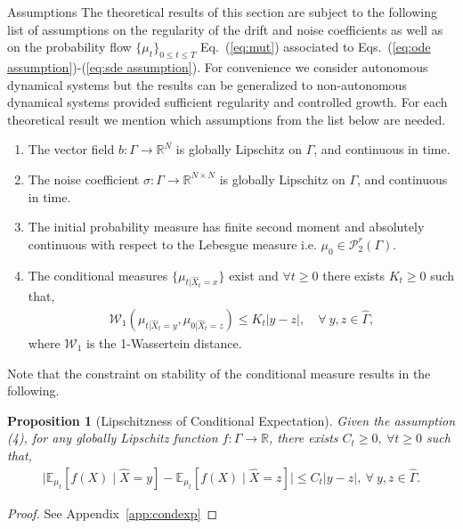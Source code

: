 \documentclass[11pt, a4paper, oneside, reqno]{amsart}
\makeatletter
\def\subsection{\@startsection{subsection}{2}%
	\z@{.5\linespacing\@plus.7\linespacing}{.5\linespacing}%
	{\normalfont\large\bfseries}}
\newtheorem{proposition}[theorem]{Proposition}
\makeatother
\begin{document}
\subsection{Assumptions}\label{sec:assumptions}
\noindent The theoretical results of this section are subject to the following list of assumptions on the regularity of the drift and noise coefficients as well as on the probability flow $\{\mu_t\}_{0\leq t\leq T}$ Eq.~(\ref{eq:mut}) associated to Eqs.~(\ref{eq:ode assumption})-(\ref{eq:sde assumption}). 
For convenience we consider autonomous dynamical systems but the results can be generalized to non-autonomous dynamical systems provided sufficient regularity and controlled growth. 
For each theoretical result we mention which assumptions from the list below are needed.
\begin{enumerate}
    \item The vector field $b:\Gamma \to\mathbb{R}^N$ is globally Lipschitz on $\Gamma$, and continuous in time. 
    \item The noise coefficient $\sigma:\Gamma\to\mathbb{R}^{N\times N}$ is globally Lipschitz on $\Gamma$, and continuous in time. 
    \item The initial probability measure has finite second moment and absolutely continuous with respect to the Lebesgue measure i.e. $\mu_0\in\mathcal{P}^r_2(\Gamma)$.
    \item The conditional measures $\{\mu_{t|\hat{X}_t=x}\}$ exist and $\forall t\geq 0$ there exists $K_t\geq 0$ such that,
    \begin{eqnarray}
    \mathcal{W}_1(\mu_{t|\hat{X}_t=y},\mu_{0|\hat{X}_t=z})\leq K_t|y-z|, \quad \forall \ y,z \in \hat{\Gamma},
    \end{eqnarray}
    where $\mathcal{W}_1$ is the 1-Wassertein distance. 
\end{enumerate}
Note that the constraint on stability of the conditional measure results in the following. 
\begin{proposition}[Lipschitzness of Conditional Expectation]\label{prop:lipschitz mckean-vlasov}
Given the assumption (4), for any globally Lipschitz function $f:\Gamma\to\mathbb{R}$, there exists $C_t\geq 0, \ \forall t\geq0$ such that,  
\begin{eqnarray}
        \big|\mathbb{E}_{\mu_t}[f(X)\mid \hat{X}=y] - \mathbb{E}_{\mu_t}[f(X)\mid \hat{X}=z]\big|\leq C_t|y-z|,\: \forall \ y,z\in\hat{\Gamma}.
\end{eqnarray}
\end{proposition}
\begin{proof}
    See Appendix~\ref{app:condexp}
\end{proof}
\end{document}
